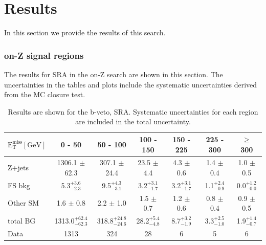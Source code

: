 \chapter{Results}
\label {ch:results}

In this section we provide the results of this search. 

\subsection{on-Z signal regions}

The results for SRA in the on-Z search are shown in this section.
The uncertainties in the tables and plots include the systematic uncertainties derived from the MC closure test.

\begin{table}[htb]
\scriptsize
\begin{center}
\caption{\label{tab:results_bveto_SRA} 
Results are shown for the b-veto, SRA.
Systematic uncertainties for each region are included in the total uncertainty. 
}
\begin{tabular}{l|c|c|c|c|c|c}
\hline
\hline
$\mathrm{E_{T}^{miss} [GeV]}$ &0 - 50 & 50 - 100 & 100 - 150 & 150 - 225 & 225 - 300 & $\geq$ 300 \\
\hline 
Z+jets&  1306.1 $\pm$ 62.3 &  307.1 $\pm$ 24.4 &  23.5 $\pm$ 4.4 &  4.3 $\pm$ 0.6 &  1.4 $\pm$ 0.4 &  1.0 $\pm$ 0.5 \\ 
FS bkg&  5.3$^{+ 3.6}_{- 2.3}$ &  9.5$^{+ 4.3}_{- 3.1}$ &  3.2$^{+ 3.1}_{- 1.7}$ &  3.2$^{+ 3.1}_{- 1.7}$ &  1.1$^{+ 2.4}_{- 0.9}$ &  0.0$^{+ 1.2}_{- 0.0}$ \\ 
Other SM&  1.6 $\pm$ 0.8 &  2.2 $\pm$ 1.0 &  1.5 $\pm$ 0.7 &  1.2 $\pm$ 0.6 &  0.8 $\pm$ 0.4 &  0.9 $\pm$ 0.5 \\ 
\hline 
total BG&  1313.0$^{+ 62.4}_{- 62.3}$ &  318.8$^{+ 24.8}_{- 24.6}$ &  28.2$^{+ 5.4}_{- 4.8}$ &  8.7$^{+ 3.2}_{- 1.9}$ &  3.3$^{+ 2.5}_{- 1.0}$ &  1.9$^{+ 1.4}_{- 0.7}$ \\ 
\hline 
Data&  1313 &  324 &  28 &  6 &  5 &  6 \\ 
\hline
\hline
\end{tabular}
\end{center}
\end{table}


